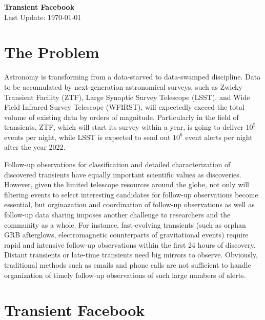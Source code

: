 \documentclass[11pt]{article}
\begin{document}

\begin{center}
  \textbf{\Large Transient Facebook}\\
  Last Update: \today
\end{center}

\section{The Problem}
\label{sec:problem}

Astronomy is transforming from a data-starved to data-swamped
discipline. Data to be accumulated by next-generation astronomical
surveys, such as Zwicky Transient Facility (ZTF), Large Synaptic
Survey Telescope (LSST), and Wide Field Infrared Survey Telescope
(WFIRST), will expectedly exceed the total volume of existing data by
orders of magnitude. Particularly in the field of transients, ZTF,
which will start its survey within a year, is going to deliver $10^5$
events per night, while LSST is expected to send out $10^6$ event
alerts per night after the year 2022. 

Follow-up observations for classification and detailed
characterization of discovered transients have equally important
scientific values as discoveries. However, given the limited telescope
resources around the globe, not only will filtering events to select
interesting candidates for follow-up observations become essential,
but orginazation and coordination of follow-up observations as well as
follow-up data sharing imposes another challenge to researchers and
the community as a whole. For instance, fast-evolving transients (such
as orphan GRB afterglows, electromagnetic counterparts of
gravitational events) require rapid and intensive follow-up
observations within the first 24 hours of discovery. Distant
transients or late-time transients need big mirrors to observe.
Obviously, traditional methods such as emails and phone calls are not
sufficient to handle organization of timely follow-up observations of
such large numbers of alerts.


\section{Transient Facebook}
\label{sec:proposal}
\end{document}
